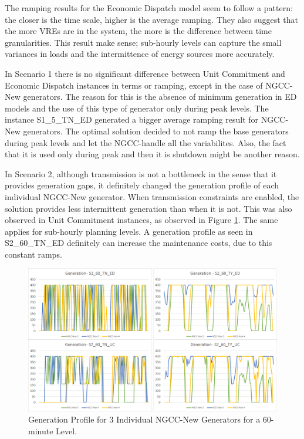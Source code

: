 \documentclass[12pt,LUDisStyle,twosided]{book}
\begin{document}
The ramping results for the Economic Dispatch model seem to follow a pattern: the closer is the time scale, higher is the average ramping. They also suggest that the more VREs are in the system, the more is the difference between time granularities. This result make sense; sub-hourly levels can capture the small variances in loads and the intermittence of energy sources more accurately. 

In Scenario 1 there is no significant difference between Unit Commitment and Economic Dispatch instances in terms or ramping, except in the case of NGCC-New generators. The reason for this is the absence of minimum generation in ED models and the use of this type of generator only during peak levels. The instance S1\_5\_TN\_ED generated a bigger average ramping result for NGCC-New generators. The optimal solution decided to not ramp the base generators during peak levels and let the NGCC-handle all the variabilites. Also, the fact that it is used only during peak and then it is shutdown might be another reason.

In Scenario 2, although transmission is not a bottleneck in the sense that it provides generation gaps, it definitely changed the generation profile of each individual NGCC-New generator. When transmission constraints are enabled, the solution provides less intermittent generation than when it is not. This was also observed in Unit Commitment instances, as observed in Figure    \ref{fig:generationProfileNGCC}. The same applies for sub-hourly planning levels. A generation profile as seen in S2\_60\_TN\_ED definitely can increase the maintenance costs, due to this constant ramps.

\begin{figure}[H] 
  \centering
  
	  \includegraphics[width=\textwidth,keepaspectratio]{generationProfileNGCC.png}
  
  \caption{Generation Profile for 3 Individual NGCC-New Generators for a 60-minute Level.}
  \label{fig:generationProfileNGCC}
  
\end{figure}
\end{document}
